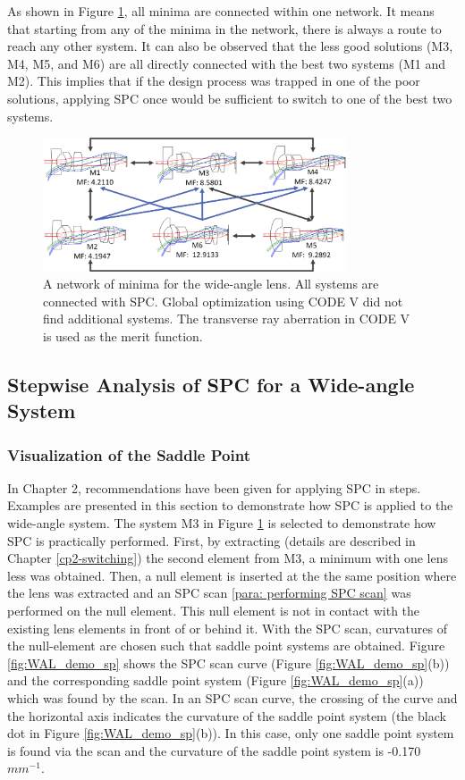 As shown in Figure \ref{fig:WAL_network}, all minima are connected within one network. It means that starting from any of the minima in the network, there is always a route to reach any other system. It can also be observed that the less good solutions (M3, M4, M5, and M6) are all directly connected with the best two systems (M1 and M2). This implies that if the design process was trapped in one of the poor solutions, applying SPC once would be sufficient to switch to one of the best two systems.  

\begin{figure}[h!]
    \centering
    \includegraphics[width=0.8\textwidth]{chapter-4/figures/WAL_network.png}
    \caption{A network of minima for the wide-angle lens. All systems are connected with SPC. Global optimization using CODE V did not find additional systems. The transverse ray aberration in CODE V is used as the merit function.}
    \label{fig:WAL_network}
\end{figure}

\subsection{Stepwise Analysis of SPC for a Wide-angle System}
\subsubsection{Visualization of the Saddle Point }
In Chapter 2, recommendations have been given for applying SPC in steps. Examples are presented in this section to demonstrate how SPC is applied to the wide-angle system. The system M3 in Figure \ref{fig:WAL_network} is selected to demonstrate how SPC is practically performed. First, by extracting (details are described in Chapter \ref{cp2-switching}) the second element from M3, a minimum with one lens less was obtained. Then, a null element is inserted at the the same position where the lens was extracted and an SPC scan \ref{para: performing SPC scan} was performed on the null element. This null element is not in contact with the existing lens elements in front of or behind it.  With the SPC scan, curvatures of the null-element are chosen such that saddle point systems are obtained. Figure \ref{fig:WAL_demo_sp} shows the SPC scan curve (Figure \ref{fig:WAL_demo_sp}(b)) and the corresponding saddle point system (Figure \ref{fig:WAL_demo_sp}(a)) which was found by the scan. In an SPC scan curve, the crossing of the curve and the horizontal axis indicates the curvature of the saddle point system (the black dot in Figure \ref{fig:WAL_demo_sp}(b)). In this case, only one saddle point system is found via the scan and the curvature of the saddle point system is -0.170 $mm^{-1}$. 

